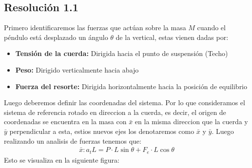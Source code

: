 \documentclass[
  11pt,
  letterpaper,
   addpoints,
  ]{exam}
\begin{document}
\begin{questions}
\begin{solution}
  \subsection*{Resolución 1.1}
Primero identificaremos las fuerzas que actúan sobre la masa $M$ cuando el péndulo está desplazado un ángulo $\theta$ de la vertical, estas vienen dadas por:
\begin{itemize}
  \item \textbf{Tensión de la cuerda:} Dirigida hacia el punto de suspensión (Techo)
  \item \textbf{Peso:} Dirigido verticalmente hacia abajo
  \item \textbf{Fuerza del resorte:} Dirigida horizontalmente hacia la posición de equilibrio
\end{itemize}
Luego deberemos definir las coordenadas del sistema. Por lo que consideramos el sistema de referencia rotado en direccion a la cuerda, es decir, el origen de coordenadas se encuentra en la masa con $\bar{x}$ en la misma direccion que la cuerda y $\bar{y}$ perpendicular a esta, estios nuevos ejes los denotaremos como $\bar{x}$ y $\bar{y}$. Luego realizando un analisis de fuerzas tenemos que:
\begin{align}
  \text{$\bar{x}$}: a_{t} L = P \cdot L \sin\theta + F_e \cdot L \cos\theta 
\end{align}
Esto se visualiza en la siguiente figura:

\begin{figure}[H]
\centering
{}
\end{figure}
\end{solution}
\end{questions}
\end{document}

